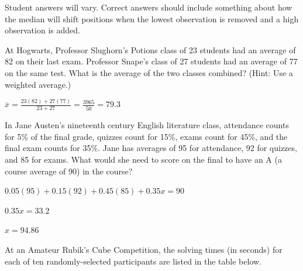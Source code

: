 \documentclass[noanswers]{exam}
\begin{document}
\begin{questions}
\begin{solution}[\stretch{1}]
			\vspace{3mm}		
		
			Student answers will vary. Correct answers should include something about how the median will shift positions when the lowest observation is removed and a high observation is added.

			\vspace{3mm}		
			
		\end{solution}
		
	\question At Hogwarts, Professor Slughorn's Potions class of 23 students had an average of 82 on their last exam. Professor Snape's class of 27 students had an average of 77 on the same test. What is the average of the two classes combined? (Hint: Use a weighted average.)
	
	\begin{solution}[\stretch{1}]
	
	\vspace{3mm}
	
	$\displaystyle \overline{x}=\frac{23(82)+27(77)}{23+27}=\frac{3965}{50}=79.3$
	
	\vspace{3mm}
	
	\end{solution}
	
	\question In Jane Austen's nineteenth century English literature class, attendance counts for 5\% of the final grade, quizzes count for 15\%, exams count for 45\%, and the final exam counts for 35\%. Jane has averages of 95 for attendance, 92 for quizzes, and 85 for exams. What would she need to score on the final to have an A (a course average of 90) in the course?
	
	\begin{solution}[\stretch{1}]
	
			\vspace{3mm}
			
			$0.05(95)+0.15(92)+0.45(85)+0.35x=90$
			
			\vspace{3mm}
			
			$0.35x=33.2$

			\vspace{3mm}	
			
			$x=94.86$	
			
		\end{solution}
		
	\newpage
	
	\question At an Amateur Rubik's Cube Competition, the solving times (in seconds) for each of ten randomly-selected participants are listed in the table below. 
	

\end{questions}
\end{document}
